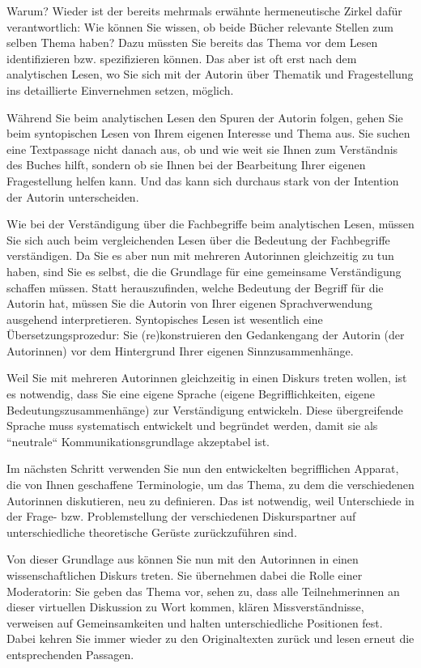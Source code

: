 \documentclass[]{book}
\theoremstyle{definition}
\theoremstyle{definition}
\theoremstyle{definition}
\theoremstyle{remark}
\begin{document}
Warum? Wieder ist der bereits mehrmals erwähnte hermeneutische Zirkel
dafür verantwortlich: Wie können Sie wissen, ob beide Bücher relevante
Stellen zum selben Thema haben? Dazu müssten Sie bereits das Thema vor
dem Lesen identifizieren bzw. spezifizieren können. Das aber ist oft
erst nach dem analytischen Lesen, wo Sie sich mit der Autorin über
Thematik und Fragestellung ins detaillierte Einvernehmen setzen,
möglich.

Während Sie beim analytischen Lesen den Spuren der Autorin folgen, gehen
Sie beim syntopischen Lesen von Ihrem eigenen Interesse und Thema aus.
Sie suchen eine Textpassage nicht danach aus, ob und wie weit sie Ihnen
zum Verständnis des Buches hilft, sondern ob sie Ihnen bei der
Bearbeitung Ihrer eigenen Fragestellung helfen kann. Und das kann sich
durchaus stark von der Intention der Autorin unterscheiden.

Wie bei der Verständigung über die Fachbegriffe beim analytischen Lesen,
müssen Sie sich auch beim vergleichenden Lesen über die Bedeutung der
Fachbegriffe verständigen. Da Sie es aber nun mit mehreren Autorinnen
gleichzeitig zu tun haben, sind Sie es selbst, die die Grundlage für
eine gemeinsame Verständigung schaffen müssen. Statt herauszufinden,
welche Bedeutung der Begriff für die Autorin hat, müssen Sie die Autorin
von Ihrer eigenen Sprachverwendung ausgehend interpretieren.
Syntopisches Lesen ist wesentlich eine Übersetzungsprozedur: Sie
(re)konstruieren den Gedankengang der Autorin (der Autorinnen) vor dem
Hintergrund Ihrer eigenen Sinnzusammenhänge.

Weil Sie mit mehreren Autorinnen gleichzeitig in einen Diskurs treten
wollen, ist es notwendig, dass Sie eine eigene Sprache (eigene
Begrifflichkeiten, eigene Bedeutungszusammenhänge) zur Verständigung
entwickeln. Diese übergreifende Sprache muss systematisch entwickelt und
begründet werden, damit sie als ``neutrale`` Kommunikationsgrundlage
akzeptabel ist.

Im nächsten Schritt verwenden Sie nun den entwickelten begrifflichen
Apparat, die von Ihnen geschaffene Terminologie, um das Thema, zu dem
die verschiedenen Autorinnen diskutieren, neu zu definieren. Das ist
notwendig, weil Unterschiede in der Frage- bzw. Problemstellung der
verschiedenen Diskurspartner auf unterschiedliche theoretische Gerüste
zurückzuführen sind.

Von dieser Grundlage aus können Sie nun mit den Autorinnen in einen
wissenschaftlichen Diskurs treten. Sie übernehmen dabei die Rolle einer
Moderatorin: Sie geben das Thema vor, sehen zu, dass alle
Teilnehmerinnen an dieser virtuellen Diskussion zu Wort kommen, klären
Missverständnisse, verweisen auf Gemeinsamkeiten und halten
unterschiedliche Positionen fest. Dabei kehren Sie immer wieder zu den
Originaltexten zurück und lesen erneut die entsprechenden Passagen.
\end{document}
